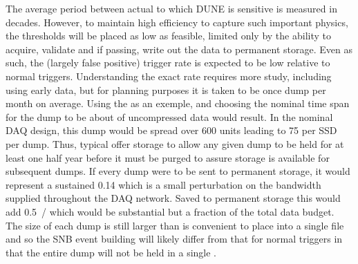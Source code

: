 The average period between actual  to which DUNE is
sensitive is measured in decades. 
However, to maintain high efficiency to capture such important
physics, the thresholds will be placed as low as feasible, limited
only by the ability to acquire, validate and if passing, write out the
data to permanent storage. 
Even as such, the (largely false positive)  trigger rate is
expected to be low relative to normal triggers.
Understanding the exact rate requires more study, including using
early data, but for planning purposes it is taken to be once dump per
month on average.
Using the   as an exemple, and choosing the
nominal time span for the dump to be \snbtime about \spsnbsize of
uncompressed data would result.
In the nominal  DAQ design, this dump would be spread over
600  units leading to \SI{75}{\GB} per SSD per dump.
Thus, typical  offer storage to allow any given dump to be
held for at least one half year before it must be purged to assure
storage is available for subsequent dumps.
If every dump were to be sent to permanent storage, it would represent
a sustained \SI{0.14}{\Gbps} which is a small perturbation on the
bandwidth supplied throughout the DAQ network. 
Saved to permanent storage this would add \SI{0.5}{\PB/\year} which
would be substantial but a fraction of the total data budget.
The size of each dump is still larger than is convenient to place into
a single file and so the SNB event building will likely differ from
that for normal triggers in that the entire dump will not be held in a
single .

